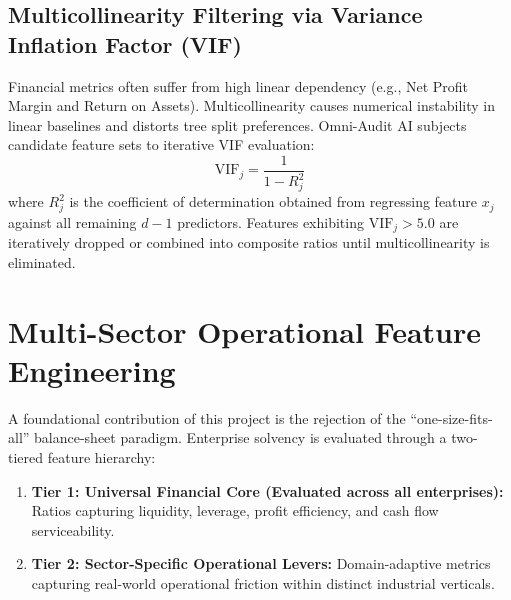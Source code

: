 \documentclass[11pt, a4paper]{article}
\begin{document}
\subsection{Multicollinearity Filtering via Variance Inflation Factor (VIF)}
Financial metrics often suffer from high linear dependency (e.g., Net Profit Margin and Return on Assets). Multicollinearity causes numerical instability in linear baselines and distorts tree split preferences. Omni-Audit AI subjects candidate feature sets to iterative VIF evaluation:
\begin{equation}
    \text{VIF}_j = \frac{1}{1 - R_j^2}
\end{equation}
where $R_j^2$ is the coefficient of determination obtained from regressing feature $x_j$ against all remaining $d-1$ predictors. Features exhibiting $\text{VIF}_j > 5.0$ are iteratively dropped or combined into composite ratios until multicollinearity is eliminated.

\clearpage

\section{Multi-Sector Operational Feature Engineering}

A foundational contribution of this project is the rejection of the ``one-size-fits-all'' balance-sheet paradigm. Enterprise solvency is evaluated through a two-tiered feature hierarchy:
\begin{enumerate}
    \item \textbf{Tier 1: Universal Financial Core (Evaluated across all enterprises):} Ratios capturing liquidity, leverage, profit efficiency, and cash flow serviceability.
    \item \textbf{Tier 2: Sector-Specific Operational Levers:} Domain-adaptive metrics capturing real-world operational friction within distinct industrial verticals.
\end{enumerate}
\end{document}
